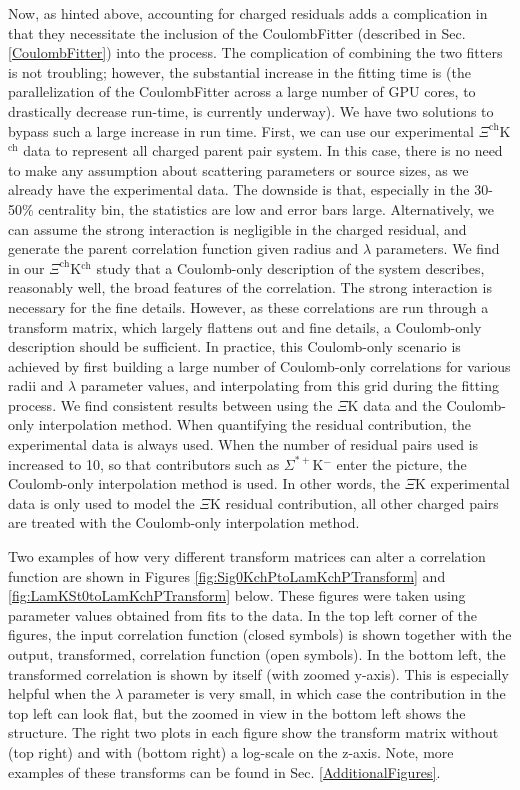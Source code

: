 \documentclass[../AnalysisNoteJBuxton.tex]{subfiles}
\begin{document}
Now, as hinted above, accounting for charged residuals adds a complication in that they necessitate the inclusion of the CoulombFitter (described in Sec. \ref{CoulombFitter}) into the process.  The complication of combining the two fitters is not troubling; however, the substantial increase in the fitting time is (the parallelization of the CoulombFitter across a large number of GPU cores, to drastically decrease run-time, is currently underway).  We have two solutions to bypass such a large increase in run time.  First, we can use our experimental $\Xi^{\mathrm{ch}}$K$^{\mathrm{ch}}$ data to represent all charged parent pair system.  In this case, there is no need to make any assumption about scattering parameters or source sizes, as we already have the experimental data.  The downside is that, especially in the 30-50\% centrality bin, the statistics are low and error bars large.  Alternatively, we can assume the strong interaction is negligible in the charged residual, and generate the parent correlation function given radius and $\lambda$ parameters.  We find in our $\Xi^{\mathrm{ch}}$K$^{\mathrm{ch}}$ study that a Coulomb-only description of the system describes, reasonably well, the broad features of the correlation.  The strong interaction is necessary for the fine details.  However, as these correlations are run through a transform matrix, which largely flattens out and fine details, a Coulomb-only description should be sufficient.  In practice, this Coulomb-only scenario is achieved by first building a large number of Coulomb-only correlations for various radii and $\lambda$ parameter values, and interpolating from this grid during the fitting process.  We find consistent results between using the $\Xi$K data and the Coulomb-only interpolation method.  When quantifying the \XiKpm residual contribution, the experimental \XiKpm data is always used.  When the number of residual pairs used is increased to 10, so that contributors such as $\Sigma^{*+}$K$^{-}$ enter the picture, the Coulomb-only interpolation method is used.  In other words, the $\Xi$K experimental data is only used to model the $\Xi$K residual contribution, all other charged pairs are treated with the Coulomb-only interpolation method.

Two examples of how very different transform matrices can alter a correlation function are shown in Figures \ref{fig:Sig0KchPtoLamKchPTransform} and \ref{fig:LamKSt0toLamKchPTransform} below.  These figures were taken using parameter values obtained from fits to the data.  In the top left corner of the figures, the input correlation function (closed symbols) is shown together with the output, transformed, correlation function (open symbols).  In the bottom left, the transformed correlation is shown by itself (with zoomed y-axis).  This is especially helpful when the $\lambda$ parameter is very small, in which case the contribution in the top left can look flat, but the zoomed in view in the bottom left shows the structure.  The right two plots in each figure show the transform matrix without (top right) and with (bottom right) a log-scale on the z-axis.  Note, more examples of these transforms can be found in Sec. \ref{AdditionalFigures}.
\end{document}
